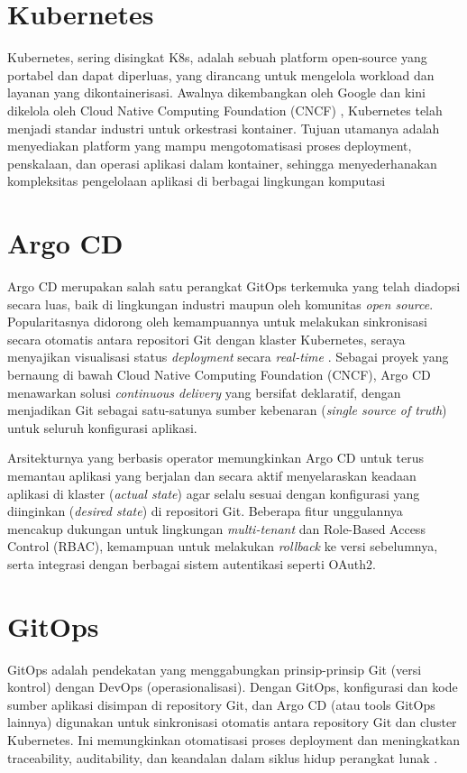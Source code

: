 \section{Kubernetes}
Kubernetes, sering disingkat K8s, adalah sebuah platform open-source yang
portabel dan dapat diperluas, yang dirancang untuk mengelola workload dan
layanan yang dikontainerisasi. Awalnya dikembangkan oleh Google dan kini
dikelola oleh Cloud Native Computing Foundation (CNCF) \cite{kubernetes_2021},
Kubernetes telah menjadi standar industri untuk orkestrasi kontainer. Tujuan
utamanya adalah menyediakan platform yang mampu mengotomatisasi proses
deployment, penskalaan, dan operasi aplikasi dalam kontainer, sehingga
menyederhanakan kompleksitas pengelolaan aplikasi di berbagai lingkungan
komputasi

\section{Argo CD}
Argo CD merupakan salah satu perangkat GitOps terkemuka yang telah diadopsi
secara luas, baik di lingkungan industri maupun oleh komunitas \textit{open
  source}. Popularitasnya didorong oleh kemampuannya untuk melakukan sinkronisasi
secara otomatis antara repositori Git dengan klaster Kubernetes, seraya
menyajikan visualisasi status \textit{deployment} secara \textit{real-time}
\cite{ArgoCDDocs}. Sebagai proyek yang bernaung di bawah Cloud Native Computing
Foundation (CNCF), Argo CD menawarkan solusi \textit{continuous delivery} yang
bersifat deklaratif, dengan menjadikan Git sebagai satu-satunya sumber
kebenaran (\textit{single source of truth}) untuk seluruh konfigurasi aplikasi.

Arsitekturnya yang berbasis operator memungkinkan Argo CD untuk terus memantau
aplikasi yang berjalan dan secara aktif menyelaraskan keadaan aplikasi di
klaster (\textit{actual state}) agar selalu sesuai dengan konfigurasi yang
diinginkan (\textit{desired state}) di repositori Git. Beberapa fitur
unggulannya mencakup dukungan untuk lingkungan \textit{multi-tenant} dan
Role-Based Access Control (RBAC), kemampuan untuk melakukan \textit{rollback}
ke versi sebelumnya, serta integrasi dengan berbagai sistem autentikasi seperti
OAuth2.

\section{GitOps}
GitOps adalah pendekatan yang menggabungkan prinsip-prinsip Git (versi kontrol)
dengan DevOps (operasionalisasi). Dengan GitOps, konfigurasi dan kode sumber
aplikasi disimpan di repository Git, dan Argo CD (atau tools GitOps lainnya)
digunakan untuk sinkronisasi otomatis antara repository Git dan cluster
Kubernetes. Ini memungkinkan otomatisasi proses deployment dan meningkatkan
traceability, auditability, dan keandalan dalam siklus hidup perangkat lunak
\cite{Beetz2022}.

